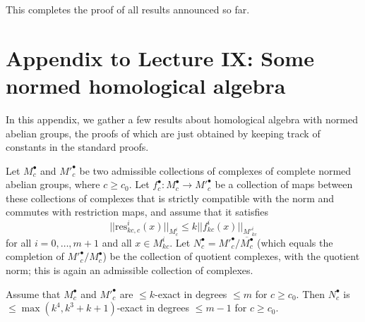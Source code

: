 This completes the proof of all results announced so far.

\newpage

\section*{Appendix to Lecture IX: Some normed homological algebra}

In this appendix, we gather a few results about homological algebra with normed abelian groups, the proofs of which are just obtained by keeping track of constants in the standard proofs.


\begin{proposition}
  \label{snakelemma}
  Let $M^\bullet_c$ and $M'^\bullet_c$ be two admissible collections
  of complexes of complete normed abelian groups, where $c\geq c_0$.
  Let $f^\bullet_c: M^\bullet_c\to M'^\bullet_c$ be a collection of maps
  between these collections of complexes
  that is strictly compatible with the norm and commutes with restriction maps,
  and assume that it satisfies
  \[
  ||\mathrm{res}^i_{kc,c}(x)||_{M^i_c}\leq k||f^i_{kc}(x)||_{M'^i_{kc}}
  \]
  for all $i=0,\ldots,m+1$ and all $x\in M^i_{kc}$.
  Let $N^\bullet_c=M'^\bullet_c/\overline{M^\bullet_c}$
  (which equals the completion of $M'^{\bullet}_c/M^\bullet_c$)
  be the collection of quotient complexes, with the quotient norm;
  this is again an admissible collection of complexes.

  Assume that $M^\bullet_c$ and $M'^\bullet_c$ are $\leq k$-exact in degrees $\leq m$ for $c\geq c_0$.
  Then $N^\bullet_c$ is $\leq \max(k^4,k^3+k+1)$-exact in degrees $\leq m-1$ for $c\geq c_0$.
\end{proposition}

